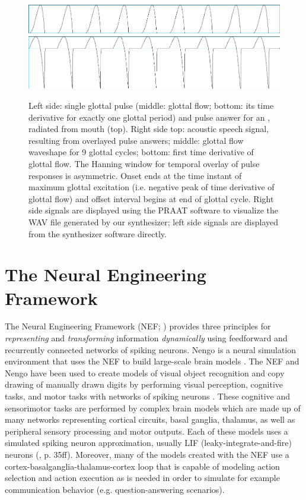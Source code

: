 \documentclass[conference]{IEEEtran}
\let\ipa\textipa
\begin{document}
\begin{figure}[!t]
\begin{minipage}[b]{0.8\columnwidth}
    \includegraphics[width=\textwidth]{signal3}\\
    \includegraphics[width=\textwidth]{signal4}
  \end{minipage}
  \caption{Left side: single glottal pulse (middle: glottal flow;
    bottom: its time derivative for exactly one glottal period) and
    pulse answer for an \ipa{[A]}, radiated from mouth (top). Right side
    top: acoustic speech signal, resulting from overlayed pulse
    answers; middle: glottal flow waveshape for 9 glottal cycles;
    bottom: first time derivative of glottal flow. The Hanning window
    for temporal overlay of pulse responses is asymmetric. Onset ends
    at the time instant of maximum glottal excitation (i.e. negative peak
    of time derivative of glottal flow) and offset interval begins at
    end of glottal cycle. Right side signals are displayed using
    the PRAAT software to visualize the WAV file generated by our
    synthesizer; left side signals are displayed from the synthesizer
    software directly.}
\label{fig:signal}
\end{figure}

\section{The Neural Engineering Framework}

The Neural Engineering Framework (NEF; \cite{eliasmith2003})
provides three principles for \textit{representing} and
\textit{transforming} information \textit{dynamically}
using feedforward and recurrently connected networks
of spiking neurons.
Nengo is a neural simulation environment that uses the NEF
to build large-scale brain models \cite{bekolay2014}.
The NEF and Nengo have been used to create models of visual
object recognition and copy drawing of manually drawn digits by
performing visual perception, cognitive tasks, and motor tasks
with networks of spiking neurons \cite{eliasmith2012,eliasmith2013}.
These cognitive and sensorimotor tasks are performed by
complex brain models which are made up of many networks representing
cortical circuits, basal ganglia, thalamus, as well as peripheral
sensory processing and motor outputs.
Each of these models uses a simulated spiking neuron approximation,
usually LIF (leaky-integrate-and-fire) neurons
(\cite{eliasmith2013}, p. 35ff).
Moreover, many of the models created with the NEF
use a cortex-basalganglia-thalamus-cortex loop
that is capable of modeling action
selection and action execution as is needed in order to simulate for
example communication behavior (e.g. question-answering scenarios).
\end{document}
